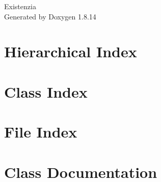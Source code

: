 \documentclass[twoside]{book}
\newcommand{\+}{\discretionary{\mbox{\scriptsize$\hookleftarrow$}}{}{}}
\newcommand{\clearemptydoublepage}{%
  \newpage{\pagestyle{empty}\cleardoublepage}%
}
\begin{document}
\hypersetup{pageanchor=false,
             bookmarksnumbered=true,
             pdfencoding=unicode
            }
\begin{titlepage}
\vspace*{7cm}
\begin{center}%
{\Large Existenzia }\\
\vspace*{1cm}
{\large Generated by Doxygen 1.8.14}\\
\end{center}
\end{titlepage}
\clearemptydoublepage
{}
\tableofcontents
\clearemptydoublepage
{}
\hypersetup{pageanchor=true}

\chapter{Hierarchical Index}

\chapter{Class Index}

\chapter{File Index}

\chapter{Class Documentation}













































\end{document}
